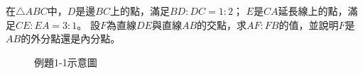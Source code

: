 \documentclass[12pt]{article}
\newif\ifshow
\begin{document}
\newpage
\fi
\begin{mybox}[例題\thesection-1]{6em}{1em}{1em}
    在$\triangle{ABC}$中，$D$是邊$BC$上的點，滿足$BD:DC=1:2$；
    $E$是$CA$延長線上的點，滿足$CE:EA=3:1$。
    設$F$為直線$DE$與直線$AB$的交點，求$AF:FB$的值，並說明$F$是$AB$的外分點還是內分點。
    \begin{figure}[H]
        \centering 
        \caption{例題1-1示意圖}
        \label{fig:coline_s1-3}
    \end{figure}
\end{mybox}
\ifshow
\begin{mybox}[解]{3em}{1em}{1em}
根據梅涅勞斯定理：
    \[
        \frac{\overrightarrow{BD}}{\overrightarrow{DC}}
        \cdot\frac{\overrightarrow{CE}}{\overrightarrow{EA}}
        \cdot\frac{\overrightarrow{AF}}{\overrightarrow{FB}}=-1
    \]

    $D$在$BC$上，$BD:DC=1:2$，
    即$\overrightarrow{BD}/\overrightarrow{DC}=\frac{1}{2}$。

    $E$在$CA$延長線上，$CE:EA=3:2$，
    所以$\overrightarrow{CE}/\overrightarrow{EA}=-3$。

    代入梅涅勞斯定理：
    \begin{align*}
        &\frac{1}{2}\cdot\left(-3\right)
        \cdot\frac{\overrightarrow{AF}}{\overrightarrow{FB}}=-1\\
        \Leftrightarrow\quad&\frac{\overrightarrow{AF}}{\overrightarrow{FB}}=\frac{2}{3}
    \end{align*}
    因此$AF:FB=2:3$且$F$是$AB$的內分點。
\end{mybox}
\newpage
\fi
\end{document}
